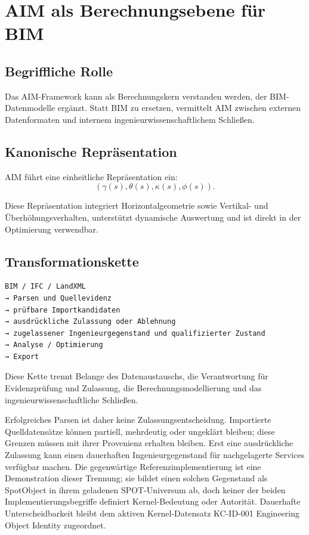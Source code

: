 \section{AIM als Berechnungsebene für BIM}

\subsection{Begriffliche Rolle}

Das AIM-Framework kann als Berechnungskern verstanden werden, der
BIM-Datenmodelle ergänzt. Statt BIM zu ersetzen, vermittelt AIM zwischen
externen Datenformaten und internem ingenieurwissenschaftlichem Schließen.

\subsection{Kanonische Repräsentation}

AIM führt eine einheitliche Repräsentation ein:
\[
(\gamma(s), \theta(s), \kappa(s), \phi(s)).
\]

Diese Repräsentation integriert Horizontalgeometrie sowie Vertikal- und
Überhöhungsverhalten, unterstützt dynamische Auswertung und ist direkt in
der Optimierung verwendbar.

\subsection{Transformationskette}

\begin{verbatim}
BIM / IFC / LandXML
→ Parsen und Quellevidenz
→ prüfbare Importkandidaten
→ ausdrückliche Zulassung oder Ablehnung
→ zugelassener Ingenieurgegenstand und qualifizierter Zustand
→ Analyse / Optimierung
→ Export
\end{verbatim}

Diese Kette trennt Belange des Datenaustauschs, die Verantwortung für
Evidenzprüfung und Zulassung, die Berechnungsmodellierung und das
ingenieurwissenschaftliche Schließen.

Erfolgreiches Parsen ist daher keine Zulassungsentscheidung. Importierte
Quelldatensätze können partiell, mehrdeutig oder ungeklärt bleiben; diese
Grenzen müssen mit ihrer Provenienz erhalten bleiben. Erst eine ausdrückliche
Zulassung kann einen dauerhaften Ingenieurgegenstand für nachgelagerte Services
verfügbar machen. Die gegenwärtige Referenzimplementierung ist eine
Demonstration dieser Trennung; sie bildet einen solchen Gegenstand als
SpotObject in ihrem geladenen SPOT-Universum ab, doch keiner der beiden
Implementierungsbegriffe definiert Kernel-Bedeutung oder Autorität. Dauerhafte
Unterscheidbarkeit bleibt dem aktiven Kernel-Datensatz KC-ID-001 Engineering
Object Identity zugeordnet.

